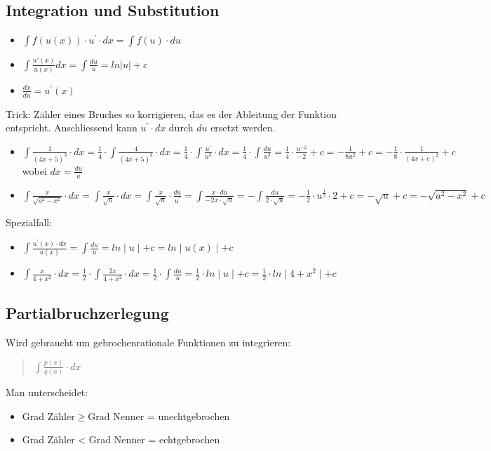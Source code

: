 \subsection*{Integration und Substitution}
\begin{itemize}
\item $\int f(u(x))\cdot u^{\prime}\cdot dx=\int f(u)\cdot du$
\item $\int\frac{u'(x)}{u(x)}dx=\int\frac{du}{u}=ln|u|+c$
\item $\frac{dx}{du}=u^{\prime}(x)$
\end{itemize}
Trick: Zähler eines Bruches so korrigieren, das es der Ableitung der
Funktion entspricht. Anschliessend kann $u^{\prime}\cdot dx$ durch
$du$ ersetzt werden.
\begin{itemize}
\item $\int\frac{1}{(4x+5)^{3}}\cdot dx=\frac{1}{4}\cdot\int\frac{4}{(4x+5)^{3}}\cdot dx=\frac{1}{4}\cdot\int\frac{u^{\prime}}{u^{3}}\cdot dx=\frac{1}{4}\cdot\int\frac{du}{u^{3}}=\frac{1}{4}\cdot\frac{u^{-2}}{-2}+c=-\frac{1}{8u^{2}}+c=-\frac{1}{8}\cdot\frac{1}{(4x+e)^{2}}+c$
wobei $dx=\frac{du}{u}$
\item $\int\frac{x}{\sqrt{a^{2}-x^{2}}}\cdot dx=\int\frac{x}{\sqrt{u}}\cdot dx=\int\frac{x}{\sqrt{u}}\cdot\frac{du}{u^{\prime}}=\int\frac{x\cdot du}{-2x\cdot\sqrt{u}}=-\int\frac{du}{2\cdot\sqrt{u}}=-\frac{1}{2}\cdot u^{\frac{1}{2}}\cdot2+c=-\sqrt{u}+c=-\sqrt{a^{2}-x^{2}}+c$
\end{itemize}
Spezialfall:
\begin{itemize}
\item $\int\frac{u^{\prime}(x)\cdot dx}{u(x)}=\int\frac{du}{u}=ln\mid u\mid+c=ln\mid u(x)\mid+c$
\item $\int\frac{x}{4+x^{2}}\cdot dx=\frac{1}{2}\cdot\int\frac{2x}{4+x^{2}}\cdot dx=\frac{1}{2}\cdot\int\frac{du}{u}=\frac{1}{2}\cdot ln\mid u\mid+c=\frac{1}{2}\cdot ln\mid4+x^{2}\mid+c$
\end{itemize}

\subsection*{Partialbruchzerlegung}

Wird gebraucht um gebrochenrationale Funktionen zu integrieren:
\begin{verse}
$\int\frac{p(x)}{q(x)}\cdot dx$
\end{verse}
Man unterscheidet:
\begin{itemize}
\item Grad Zähler$\geq$Grad Nenner = unechtgebrochen
\item Grad Zähler < Grad Nenner = echtgebrochen
\end{itemize}

